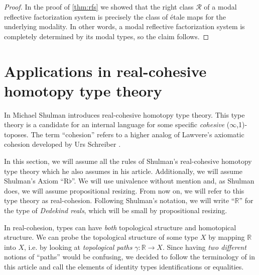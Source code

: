 \documentclass{msc}
\newcommand{\bR}{\mathbb R}
\begin{document}
\begin{proof}
  In the proof of \cref{thm:rfs} we showed that the right class $\mathcal{R}$ of a modal reflective factorization system is precisely the class of \'etale maps for the underlying modality. In other words, a modal reflective factorization system is completely determined by its modal types, so the claim follows.
\end{proof}

\section{Applications in real-cohesive homotopy type theory}
\label{subsection:toplogical stacks}

In \cite[Section 8]{ShulmanRealCohesion} Michael Shulman introduces real-cohesive homotopy type theory.
This type theory is a candidate for an internal language for some specific \emph{cohesive} ($\infty$,1)-toposes.
The term ``cohesion'' refers to a higher analog 
of Lawvere's axiomatic cohesion \cite{Lawvere07} developed by Urs Schreiber \cite{SchreiberDcct}.

In this section, we will assume all the rules of Shulman's real-cohesive homotopy type theory which he also assumes in his article.
Additionally, we will assume Shulman's Axiom ``$\mathrm{R}\flat$''.
We will use univalence without mention and, as Shulman does, we will assume propositional resizing.
From now on, we will refer to this type theory as real-cohesion.
Following Shulman's notation, we will write  ``$\bR$'' for the type of \emph{Dedekind reals}, which will be small by propositional resizing.

In real-cohesion, types can have \emph{both} topological structure and homotopical structure.
We can probe the topological structure of some type $X$ by mapping $\bR$ into $X$,
i.e. by looking at \emph{topological paths} $\gamma:\bR\to X$.
Since having \emph{two different} notions of ``paths'' would be confusing,
we decided to follow the terminology of \cite{ShulmanRealCohesion} in this article and call the elements of identity types identifications or equalities.
\end{document}
